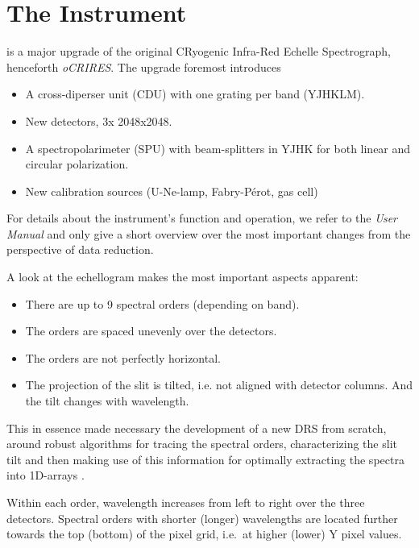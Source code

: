 \section{The Instrument}
\label{sec:instrument}

\instrument{} is a major upgrade of the original CRyogenic Infra-Red Echelle
Spectrograph, henceforth \textit{oCRIRES}. The upgrade foremost introduces
\begin{itemize}
  \item A cross-diperser unit (CDU) with one grating per band (YJHKLM).
  \item New detectors, 3x 2048x2048.
  \item A spectropolarimeter (SPU) with beam-splitters in YJHK for both linear
        and circular polarization.
  \item New calibration sources (U-Ne-lamp, Fabry-Pérot, gas cell)
\end{itemize}

For details about the instrument's function and operation, we refer to the
\emph{User Manual} \cite{CIRESMAN} and only give a short overview over the
most important changes from the perspective of data reduction.

A look at the echellogram makes the most important aspects apparent:

\begin{itemize}
  \item There are up to 9 spectral orders (depending on band).
  \item The orders are spaced unevenly over the detectors.
  \item The orders are not perfectly horizontal.
  \item The projection of the slit is tilted, i.e. not aligned with detector
    columns. And the tilt changes with wavelength.
\end{itemize}

This in essence made necessary the development of a new DRS from scratch, around
robust algorithms for tracing the spectral orders, characterizing the slit tilt
and then making use of this information for optimally extracting the spectra
into 1D-arrays \cite{2021A&A...646A..32P}.

Within each order, wavelength increases from left to right over the three
detectors. Spectral orders with shorter (longer) wavelengths are located further
towards the top (bottom) of the pixel grid, i.e.~at higher (lower) Y pixel
values.

